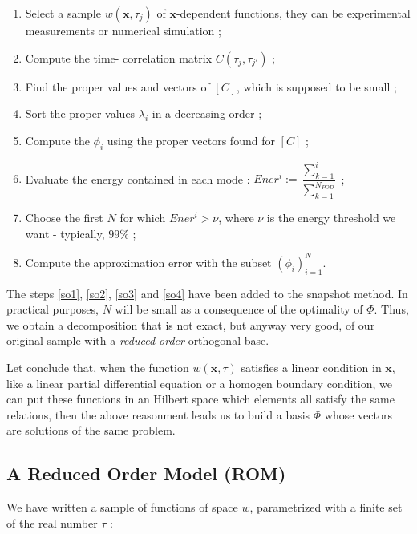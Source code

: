 \begin{algo}\label{a_snap}
\begin{enumerate}
\item Select a sample $w(\mathbf{x},\tau_j)$ of $\mathbf{x}$-dependent functions, %
they can be experimental measurements or numerical simulation ;
\item Compute the \og{}time-\fg{} correlation matrix $C(\tau_j ,\tau_{j'})$ ;
\item Find the proper values and vectors of $[C]$, which is supposed to be small ;
\item\label{so1} Sort the proper-values $\lambda_i$ in a decreasing order ;
\item Compute the $\phi_i$ using the proper vectors found for $[C]$ ;
\item\label{so2} Evaluate the energy contained in each mode : $Ener^i:=\dfrac{\sum\limits_{k=1}^i}{\sum\limits_{k=1}^{N_{POD}}}$ ;
\item\label{so3} Choose the first $N$ for which $Ener^i >\nu$, where $\nu$ is the energy threshold we want - typically, $99\%$ ;
\item\label{so4} Compute the approximation error with the subset $(\phi_i)_{i=1}^{N}$.
\end{enumerate}
\end{algo}

The steps \ref{so1}, \ref{so2}, \ref{so3} and \ref{so4} have been added to the snapshot method. %
In practical purposes, $N$ will be small as a consequence of the optimality of $\Phi$. %
Thus, we obtain a decomposition that is not exact, but anyway very good, of our original sample with a \emph{reduced-order} orthogonal base.

\ligneinter
Let conclude that, when the function $w(\mathbf{x},\tau)$ satisfies a linear condition in $\mathbf{x}$, %
like a linear partial differential equation or a homogen boundary condition, %
we can put these functions in an Hilbert space which elements all satisfy the same relations, %
then the above reasonment leads us to build a basis $\Phi$ whose vectors are solutions of the same problem.

\subsection{A Reduced Order Model (ROM)}

We have written a sample of functions of space $w$, parametrized with a finite set of the real number $\tau$ :

